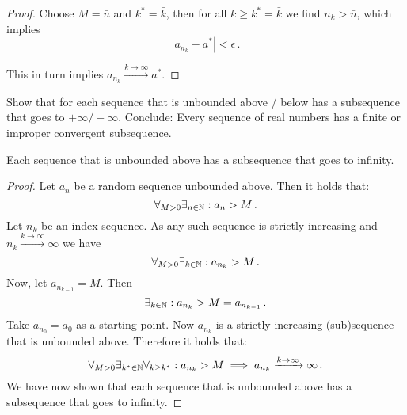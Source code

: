 \documentclass[week=4]{homework}
\begin{document}
\begin{questions}
\begin{proof}
        	Choose $M = \bar n$ and $k^* = \bar k$, then for all $k \geq k^* = \bar k$ we find $n_k > \bar n$, which implies
        	\[
	        	|a_{n_k} - a^*| < \epsilon\,.
        	\]
        	
        	This in turn implies $a_{n_k} \xrightarrow{k\to\infty} a^*$.
        \end{proof}
        
        \question 
        Show that for each sequence that is unbounded above / below has a subsequence that goes to $+ \infty / - \infty$. Conclude: Every sequence of real numbers has a finite or improper convergent subsequence. 
        
        \begin{inlinetoprove}
        	Each sequence that is unbounded above has a subsequence that goes to infinity.
        \end{inlinetoprove}
        \begin{proof}
        	Let $a_n$ be a random sequence unbounded above. Then it holds that:
        	\[
	        	\forall_{M > 0} \exists_{n \in \mathbb{N}} : a_n > M\,.
        	\]
	        Let $n_k$ be an index sequence. As any such sequence is strictly increasing and $n_k \xrightarrow{k\to\infty} \infty$ we have
	        \[
		        \forall_{M > 0} \exists_{k \in \mathbb{N}} : a_{n_{k}} > M\,.
	        \]
	        Now, let $a_{n_{k-1}} = M$. Then
	        \[
		        \exists_{k \in \mathbb{N}} : a_{n_{k}} > M = a_{n_{k-1}}\,.
	        \]
	        Take $a_{n_0} = a_0$ as a starting point. Now $a_{n_k}$ is a strictly increasing (sub)sequence that is unbounded above. Therefore it holds that:
	        \[
		        \forall_{M > 0} \exists_{k^* \in \mathbb{N}} \forall_{k \ge k^*} : a_{n_k} > M \implies a_{n_k} \xrightarrow{k \to \infty} \infty\,.
	        \]
	        We have now shown that each sequence that is unbounded above has a subsequence that goes to infinity.
        \end{proof}
        

\end{questions}
\end{document}
